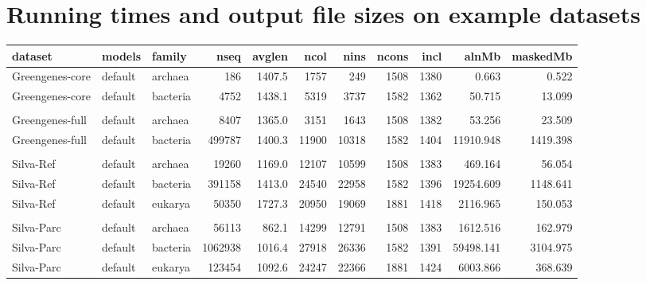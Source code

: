\section{Running times and output file sizes on example datasets}
\label{sec:stats}
\begin{table}
\begin{center}
  \scriptsize
  \begin{tabular}{lllrrrrrrrr} \hline
dataset         & models   & family   &    nseq & avglen &  ncol &  nins & ncons &  incl &      alnMb &   maskedMb \\ \hline
Greengenes-core & default  & archaea  &     186 & 1407.5 &  1757 &   249 &  1508 &  1380 &      0.663 &      0.522 \\
Greengenes-core & default  & bacteria &    4752 & 1438.1 &  5319 &  3737 &  1582 &  1362 &     50.715 &     13.099 \\
& & & & & & & & & & \\ 
Greengenes-full & default  & archaea  &    8407 & 1365.0 &  3151 &  1643 &  1508 &  1382 &     53.256 &     23.509 \\
Greengenes-full & default  & bacteria &  499787 & 1400.3 & 11900 & 10318 &  1582 &  1404 &  11910.948 &   1419.398 \\
& & & & & & & & & & \\ 
Silva-Ref       & default  & archaea  &   19260 & 1169.0 & 12107 & 10599 &  1508 &  1383 &    469.164 &     56.054 \\
Silva-Ref       & default  & bacteria &  391158 & 1413.0 & 24540 & 22958 &  1582 &  1396 &  19254.609 &   1148.641 \\
Silva-Ref       & default  & eukarya  &   50350 & 1727.3 & 20950 & 19069 &  1881 &  1418 &   2116.965 &    150.053 \\
& & & & & & & & & & \\ 
Silva-Parc      & default  & archaea  &   56113 &  862.1 & 14299 & 12791 &  1508 &  1383 &   1612.516 &    162.979 \\
Silva-Parc      & default  & bacteria & 1062938 & 1016.4 & 27918 & 26336 &  1582 &  1391 &  59498.141 &   3104.975 \\
Silva-Parc      & default  & eukarya  &  123454 & 1092.6 & 24247 & 22366 &  1881 &  1424 &   6003.866 &    368.639 \\

\end{tabular}
\end{center}
\end{table}

